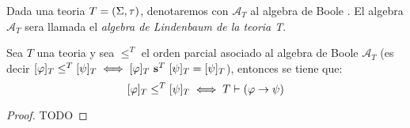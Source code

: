 \begin{definition}
  Dada una teoria $T=(\Sigma,\tau)$, denotaremos con $\mathcal{A}_T$ al algebra de Boole \algLin. El algebra
  $\mathcal{A}_T$ sera llamada el \emph{algebra de Lindenbaum de la teoria T}. 
\end{definition}
\begin{lemma}
  Sea $T$ una teoria y sea $\leq^T$ el orden parcial asociado al algebra de Boole $\mathcal{A}_T$ (es decir $[\varphi]_T\leq^T [\psi]_T  \iff [\varphi]_T\ \mathbf{s}^T\ [\psi]_T=[\psi]_T$),
  entonces se tiene que:
  $$
  [\varphi]_T\leq^T[\psi]_T \iff T\vdash(\varphi\rightarrow\psi)
  $$
\end{lemma}
\begin{proof}
  TODO
\end{proof}